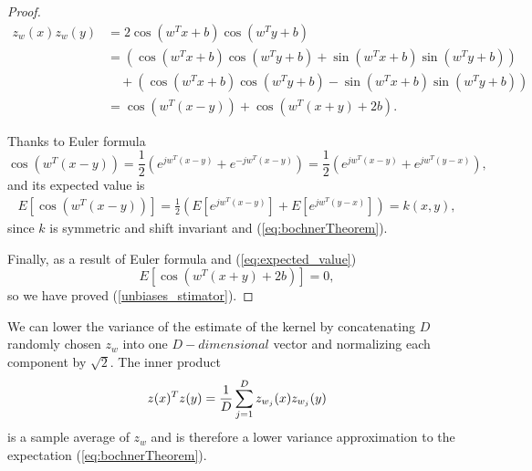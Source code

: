 \begin{proof}
\begin{align}
    z_w(x) z_w(y) 
    &=
    2  \cos\left(w^T x + b\right) \cos\left(w^T y+ b\right)
    \nonumber
    \\
    \nonumber
    & = 
    \left(
    \cos\left(w^T x + b\right) \cos\left(w^T y+ b\right)
    + 
    \sin\left(w^T x + b\right) \sin\left(w^T y+ b\right)
    \right)
    \\
    \nonumber
   & \quad +
   \left(
    \cos\left(w^T x + b\right) \cos\left(w^T y+ b\right)
    -
    \sin\left(w^T x + b\right) \sin\left(w^T y+ b\right)
    \right)
    \\
    & = 
    \cos\left(w^T (x-y) \right) + \cos\left(w^T (x+y) + 2b \right).
\end{align}

Thanks to Euler formula
\begin{equation}
    \cos\left(w^T (x-y) \right)
    = 
    \frac{1}{2}
    \left(
        e^{j w^T (x-y)}
        + 
        e^{- j w^T (x-y)}
    \right)
    = 
     \frac{1}{2}
    \left(
        e^{j w^T (x-y)}
        + 
        e^{j w^T (y-x)}
    \right),
\end{equation}
and its expected value is 
\begin{align}
    E\left[
        \cos\left(w^T (x-y) \right)
    \right]
    = 
    \frac{1}{2}
    \left(
        E\left[
         e^{j w^T (x-y)}
        \right]
        + 
        E\left[
         e^{j w^T (y-x)}
        \right]
    \right)
    = k(x,y),
\end{align}
since $k$ is symmetric and shift invariant and (\ref{eq:bochnerTheorem}).

Finally, as a result of Euler formula and (\ref{eq:expected_value})
\begin{equation}
    E\left[
        \cos\left(w^T (x+y) + 2b \right)
    \right]
    = 
    0, 
\end{equation}
so we have proved (\ref{unbiases_stimator}).

\end{proof}

We can lower the variance of the estimate of the kernel by concatenating $D$ randomly chosen $z_w$ into one $D-dimensional$ vector and normalizing each component by 
$\sqrt{2}$.
 The inner product 
 \begin{equation}
    z(x)^T z(y) = \frac{1}{D}\sum_{j=1}^{D} z_{w_j}(x)z_{w_j}(y)
 \end{equation}
 is a sample average of $z_w$ and is therefore a lower variance approximation to the expectation (\ref{eq:bochnerTheorem}). 

